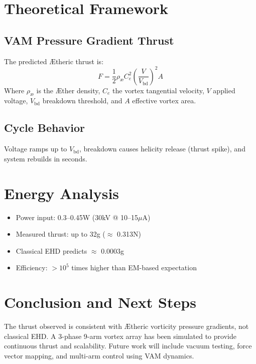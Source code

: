 \documentclass[a4paper,12pt]{article}
\begin{document}
\section{Theoretical Framework}
\subsection{VAM Pressure Gradient Thrust}
The predicted Ætheric thrust is:
\begin{equation}
    F = \frac{1}{2} \rho_\text{\ae} C_e^2 \left( \frac{V}{V_\text{bd}} \right)^2 A
\end{equation}
Where $\rho_\text{\ae}$ is the Æther density, $C_e$ the vortex tangential velocity, $V$ applied voltage, $V_\text{bd}$ breakdown threshold, and $A$ effective vortex area.


\subsection{Cycle Behavior}
Voltage ramps up to $V_\text{bd}$, breakdown causes helicity release (thrust spike), and system rebuilds in seconds.

\section{Energy Analysis}
\begin{itemize}
    \item Power input: 0.3--0.45W (30kV @ 10--15$\mu$A)
    \item Measured thrust: up to 32g ($\approx$ 0.313N)
    \item Classical EHD predicts $\approx$ 0.0003g
    \item Efficiency: $>10^5$ times higher than EM-based expectation
\end{itemize}

\section{Conclusion and Next Steps}
The thrust observed is consistent with Ætheric vorticity pressure gradients, not classical EHD. A 3-phase 9-arm vortex array has been simulated to provide continuous thrust and scalability. Future work will include vacuum testing, force vector mapping, and multi-arm control using VAM dynamics.
\end{document}
